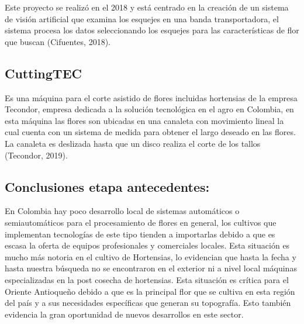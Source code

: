 Este proyecto se realizó en el 2018 y está centrado en la creación de un sistema de visión artificial que examina los esquejes en una banda transportadora, el sistema procesa los datos seleccionando los esquejes para las características de flor que buscan (Cifuentes, 2018). 

\subsection{CuttingTEC}

Es una máquina para el corte asistido de flores incluidas hortensias de la empresa Tecondor, empresa dedicada a la solución tecnológica en el agro en Colombia, en esta máquina las flores son ubicadas en una canaleta con movimiento lineal la cual cuenta con un sistema de medida para obtener el largo deseado en las flores. La canaleta es deslizada hasta que un disco realiza el corte de los tallos (Tecondor, 2019). 

\subsection{Conclusiones etapa antecedentes:}

En Colombia hay poco desarrollo local de sistemas automáticos o semiautomáticos para el procesamiento de flores en general, los cultivos que implementan tecnologías de este tipo tienden a importarlas debido a que es escasa la oferta de equipos profesionales y comerciales locales. Esta situación es mucho más notoria en el cultivo de Hortensias, lo evidencian que hasta la fecha y hasta nuestra búsqueda no se encontraron en el exterior ni a nivel local máquinas especializadas en la post cosecha de hortensias. Esta situación es crítica para el Oriente Antioqueño debido a que es la principal flor que se cultiva en esta región del país y a sus necesidades específicas que generan su topografía. Esto también evidencia la gran oportunidad de nuevos desarrollos en este sector.  

\chapterend

